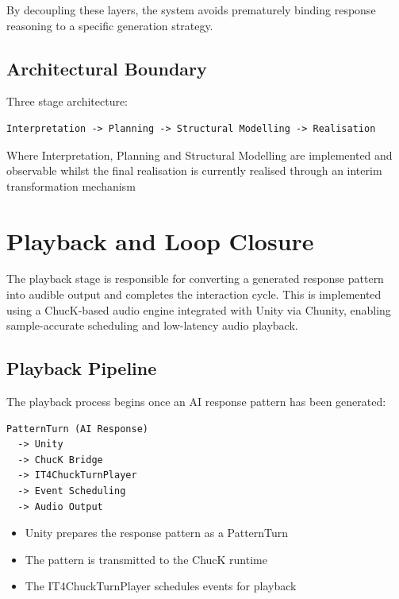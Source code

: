 By decoupling these layers, the system avoids prematurely binding
response reasoning to a specific generation strategy.

\subsection{Architectural Boundary}\label{architectural-boundary}

Three stage architecture:

\begin{lstlisting}
Interpretation -> Planning -> Structural Modelling -> Realisation
\end{lstlisting}

Where Interpretation, Planning and Structural Modelling are implemented
and observable whilst the final realisation is currently realised
through an interim transformation mechanism

\section{Playback and Loop Closure}\label{playback-and-loop-closure}

The playback stage is responsible for converting a generated response
pattern into audible output and completes the interaction cycle. This is
implemented using a ChucK-based audio engine integrated with Unity via
Chunity, enabling sample-accurate scheduling and low-latency audio
playback.

\subsection{Playback Pipeline}\label{playback-pipeline}

The playback process begins once an AI response pattern has been
generated:

\begin{lstlisting}
PatternTurn (AI Response)
  -> Unity
  -> ChucK Bridge
  -> IT4ChuckTurnPlayer
  -> Event Scheduling
  -> Audio Output
\end{lstlisting}

\begin{itemize}
\item
  Unity prepares the response pattern as a PatternTurn
\item
  The pattern is transmitted to the ChucK runtime
\item
  The IT4ChuckTurnPlayer schedules events for playback
\end{itemize}

